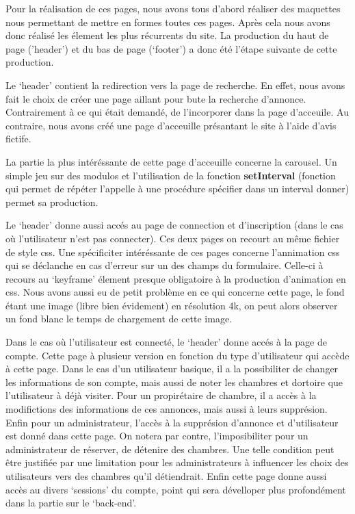 \documentclass[12pt]{article}
\begin{document}
    \vphantom{}

    Pour la réalisation de ces pages, nous avons tous d'abord réaliser des 
    maquettes nous permettant de mettre en formes toutes ces pages. Après cela 
    nous avons donc réalisé les élement les plus récurrents du site. La 
    production du haut de page ('header') et du bas de page (`footer') a donc 
    été l'étape suivante de cette production. 

    \vphantom{}

    Le `header' contient la redirection vers la page de recherche. En effet, 
    nous avons fait le choix de créer une page aillant pour bute la recherche 
    d'annonce. Contrairement à ce qui était demandé, de l'incorporer dans la page 
    d'acceuile. Au contraire, nous avons créé une page d'acceuille présantant 
    le site à l'aide d'avis fictife. 

    \vphantom{}

    La partie la plus intéréssante de cette page d'acceuille concerne la 
    carousel. Un simple jeu sur des modulos et l'utilisation de la fonction 
    \textbf{setInterval} (fonction qui permet de répéter l'appelle à une 
    procédure spécifier dans un interval donner) permet sa production. 

    \vphantom{}

    Le `header' donne aussi accés au page de connection et d'inscription (dans 
    le cas où l'utilisateur n'est pas connecter). Ces deux pages on recourt au 
    même fichier de style css. Une spécificiter intéréssante de ces pages 
    concerne l'annimation css qui se déclanche en cas d'erreur sur un des champs 
    du formulaire. Celle-ci à recours au `keyframe' élement presque obligatoire 
    à la production d'animation en css. Nous avons aussi eu de petit problème en 
    ce qui concerne cette page, le fond étant une image (libre bien évidement) 
    en résolution 4k, on peut alors observer un fond blanc le temps de 
    chargement de cette image.

    \vphantom{}
    
    Dans le cas où l'utilisateur est connecté, le `header' donne accés à la page 
    de compte. Cette page à plusieur version en fonction du type d'utilisateur 
    qui accède à cette page. Dans le cas d'un utilisateur basique, il a la 
    possibiliter de changer les informations de son compte, mais aussi de noter 
    les chambres et dortoire que l'utilisateur à déjà visiter. Pour un 
    propirétaire de chambre, il a accès à la modifictions des informations de 
    ces annonces, mais aussi à leurs supprésion. Enfin pour un administrateur,
    l'accès à la supprésion d'annonce et d'utilisateur est donné dans cette 
    page. On notera par contre, l'imposibiliter pour un administrateur de 
    réserver, de détenire des chambres. Une telle condition peut être justifiée
    par une limitation pour les administrateurs à influencer les choix des 
    utilisateurs vers des chambres qu'il détiendrait. Enfin cette page donne 
    aussi accès au divers `sessions' du compte, point qui sera dévelloper plus 
    profondément dans la partie sur le `back-end'.
\end{document}
